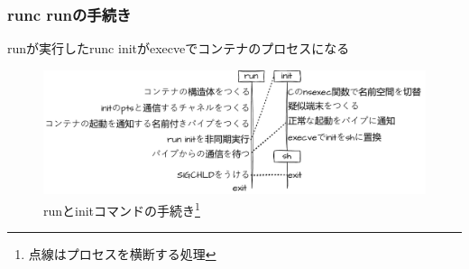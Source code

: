 \documentclass[unicode, 14pt, aspectratio=169]{beamer}
\begin{document}
\begin{frame}
  \frametitle{runc runの手続き}
  runが実行したrunc initがexecve\supercite{execve}でコンテナのプロセスになる
  \begin{figure}
    \centering
    \includegraphics[width=13cm]{images/overview.drawio.pdf}
    \caption{runとinitコマンドの手続き\footnote{点線はプロセスを横断する処理}}
    \label{fig:overview}
  \end{figure}
\end{frame}
\end{document}
